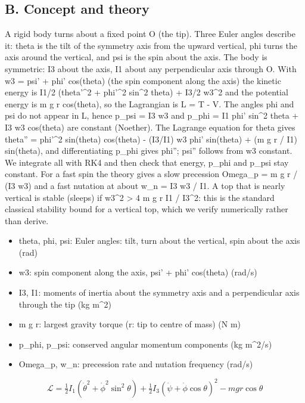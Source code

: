 \documentclass[11pt,a4paper]{article}
\begin{document}
\subsection*{B. Concept and theory}
A rigid body turns about a fixed point O (the tip). Three Euler angles describe it: theta is the tilt of the symmetry axis from the upward vertical, phi turns the axis around the vertical, and psi is the spin about the axis. The body is symmetric: I3 about the axis, I1 about any perpendicular axis through O. With w3 = psi' + phi' cos(theta) (the spin component along the axis) the kinetic energy is I1/2 (theta'\textasciicircum{}2 + phi'\textasciicircum{}2 sin\textasciicircum{}2 theta) + I3/2 w3\textasciicircum{}2 and the potential energy is m g r cos(theta), so the Lagrangian is L = T - V. The angles phi and psi do not appear in L, hence p\_psi = I3 w3 and p\_phi = I1 phi' sin\textasciicircum{}2 theta + I3 w3 cos(theta) are constant (Noether). The Lagrange equation for theta gives theta'' = phi'\textasciicircum{}2 sin(theta) cos(theta) - (I3/I1) w3 phi' sin(theta) + (m g r / I1) sin(theta), and differentiating p\_phi gives phi''; psi'' follows from w3 constant. We integrate all with RK4 and then check that energy, p\_phi and p\_psi stay constant. For a fast spin the theory gives a slow precession Omega\_p = m g r / (I3 w3) and a fast nutation at about w\_n = I3 w3 / I1. A top that is nearly vertical is stable (sleeps) if w3\textasciicircum{}2 \textgreater{} 4 m g r I1 / I3\textasciicircum{}2: this is the standard classical stability bound for a vertical top, which we verify numerically rather than derive.

\begin{itemize}[nosep]
\item theta, phi, psi: Euler angles: tilt, turn about the vertical, spin about the axis (rad)
\item w3: spin component along the axis, psi' + phi' cos(theta) (rad/s)
\item I3, I1: moments of inertia about the symmetry axis and a perpendicular axis through the tip (kg m\textasciicircum{}2)
\item m g r: largest gravity torque (r: tip to centre of mass) (N m)
\item p\_phi, p\_psi: conserved angular momentum components (kg m\textasciicircum{}2/s)
\item Omega\_p, w\_n: precession rate and nutation frequency (rad/s)
\end{itemize}

\begin{equation*}
\mathcal L = \tfrac12 I_1\left(\dot\theta^2 + \dot\phi^2\sin^2\theta\right) + \tfrac12 I_3\left(\dot\psi + \dot\phi\cos\theta\right)^2 - m g r\cos\theta
\end{equation*}
\end{document}
